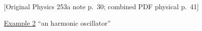 %
%
%

\providecommand{\YinPageBoundary}[2]{%
  \clearpage
  \noindent\textsf{[Original Physics 253a note p.~#1; combined PDF physical p.~#2]}%
  \par\medskip
}
\providecommand{\YinLine}[1]{\noindent #1\par}
\providecommand{\YinIndent}[1]{\noindent\hspace*{2em}#1\par}
\providecommand{\YinBullet}[1]{\noindent\hspace*{1em}$\bullet$\hspace{0.7em}#1\par}
\providecommand{\YinDash}[1]{\noindent\hspace*{1em}--\hspace{0.7em}#1\par}
\providecommand{\YinBlue}[1]{{\color[rgb]{0.00,0.34,0.92}#1}}
\providecommand{\YinLightBlue}[1]{{\color[rgb]{0.47,0.67,0.82}#1}}
\providecommand{\YinPurple}[1]{{\color[rgb]{0.61,0.16,0.88}#1}}
\providecommand{\YinGray}[1]{{\color[rgb]{0.58,0.58,0.58}#1}}
\providecommand{\YinIndigo}[1]{{\color[rgb]{0.24,0.13,0.52}#1}}
\providecommand{\YinGreen}[1]{{\color[rgb]{0.00,0.52,0.22}#1}}
\providecommand{\YinRed}[1]{{\color[rgb]{0.95,0.18,0.10}#1}}
\providecommand{\YinMagenta}[1]{{\color[rgb]{0.75,0.00,0.55}#1}}
\providecommand{\YinOrange}[1]{{\color[rgb]{0.95,0.43,0.00}#1}}
\providecommand{\ket}[1]{\lvert #1\rangle}
\providecommand{\bra}[1]{\langle #1\rvert}
\providecommand{\braket}[2]{\langle #1\mid #2\rangle}

\YinPageBoundary{30}{41}

\begin{center}
  \underline{Example 2}\hspace{3em}
  \textquotedblleft an harmonic oscillator\textquotedblright
\end{center}

